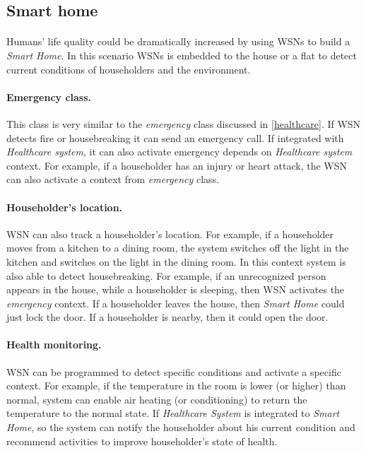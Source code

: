 \documentclass[12pt,a4paper]{article}
\begin{document}
\subsection{Smart home}
\paragraph{}
Humans' life quality could be dramatically increased by using WSNs to build a \textit{Smart Home}. In this scenario WSNs is embedded to the house or a flat to detect current conditions of householders and the environment.

\paragraph{Emergency class.} This class is very similar to the \textit{emergency} class discussed in \ref{healthcare}. If WSN detects fire or housebreaking it can send an emergency call. If integrated with \textit{Healthcare system}, it can also activate emergency depends on \textit{Healthcare system} context. For example, if a householder has an injury or heart attack, the WSN can also activate a context from \textit{emergency} class.

\paragraph{Householder's location.} WSN can also track a householder's location. For example, if a householder moves from a kitchen to a dining room, the system switches off the light in the kitchen and switches on the light in the dining room. In this context system is also able to detect housebreaking. For example, if an unrecognized person appears in the house, while a householder is sleeping, then WSN activates the \textit{emergency} context. If a householder leaves the house, then \textit{Smart Home} could just lock the door. If a householder is nearby, then it could open the door.

\paragraph{Health monitoring.} WSN can be programmed to detect specific conditions and activate a specific context. For example, if the temperature in the room is lower (or higher) than normal, system can enable air heating (or conditioning) to return the temperature to the normal state. If \textit{Healthcare System} is integrated to \textit{Smart Home}, so the system can notify the householder about his current condition and recommend activities to improve householder's state of health.
\end{document}
